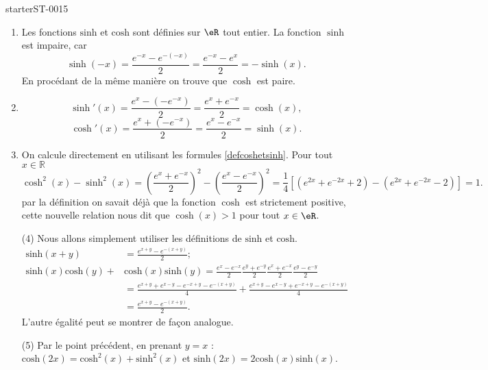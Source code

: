 
\begin{corrige}{starterST-0015}


\begin{enumerate}
\item Les fonctions  $\text{sinh}$ et  $\text{cosh}$ sont définies sur $\eR$ tout entier. La fonction $\sinh$ est impaire, car 
  \begin{equation*}
    \sinh(-x) = \frac{e^{-x}-e^{-(-x)}}{2} = \frac{e^{-x}-e^{x}}{2} = -\sinh(x).
  \end{equation*}
En procédant de la m\^eme manière on trouve que $\cosh$ est paire.  
\item 
\[
\sinh'(x) = \frac{e^{x}-\left(-e^{-x}\right)}{2} = \frac{e^{x}+e^{-x}}{2}  = \cosh(x),
\]
\[
\cosh'(x) = \frac{e^{x}+\left(-e^{-x}\right)}{2} = \frac{e^{x}-e^{-x}}{2}  = \sinh(x).
\]
\item On calcule directement en utilisant les formules \eqref{defcoshetsinh}. Pour tout $x\in\mathbb{R}$ 
\[
\cosh^2 (x) - \sinh^2 (x) = \left(\frac{e^{x}+e^{-x}}{2}\right)^2 -\left(\frac{e^{x}-e^{-x}}{2}\right)^2 = \frac{1}{4} \left[(e^{2x}+e^{-2x}+2) - (e^{2x}+e^{-2x}-2)\right] = 1.
\]
par la définition on savait déjà que la fonction $\cosh$ est strictement positive, cette nouvelle relation nous dit que $\cosh(x)>1$ pour tout $x\in\eR$.
\item[(4)] Nous allons simplement utiliser les définitions de $\text{sinh}$ et  $\text{cosh}$. 
  \begin{equation*}
    \begin{aligned}
      \text{sinh} (x+y)& = \frac{e^{x+y}-e^{-(x+y)}}{2} ; \\
      \text{sinh}(x) \text{cosh}(y)+&\text{cosh}(x)\text{sinh}(y) =\frac{e^{x}-e^{-x}}{2}\frac{e^{y}+e^{-y}}{2}\frac{e^{x}+e^{-x}}{2}\frac{e^{y}-e^{-y}}{2}\\
      &=\frac{e^{x+y}+e^{x-y}-e^{-x+y}-e^{-(x+y)}}{4} +\frac{e^{x+y}-e^{x-y}+e^{-x+y}-e^{-(x+y)}}{4} \\
      &=\frac{e^{x+y}-e^{-(x+y)}}{2}. 
    \end{aligned}
  \end{equation*}
  L'autre égalité peut se montrer de façon analogue.
\item[(5)] Par le point précédent, en prenant $y=x$ : $\text{cosh}(2x)=\text{cosh}^2(x)+\text{sinh}^2(x) $ et $\text{sinh}(2x)= 2\text{cosh}(x)\text{sinh}(x) $.

\end{enumerate}
\end{corrige}
